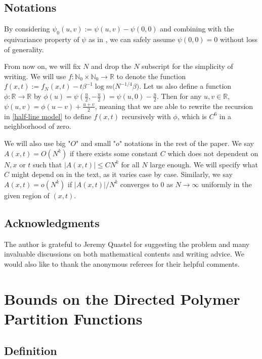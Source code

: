 \documentclass[10pt]{article}
\begin{document}
\subsection{Notations}

By considering $\psi_{0}(u, v):=\psi(u, v)-\psi(0,0)$ and combining with the equivariance property of $\psi$ as in \cite{adhikari2022invariance}, we can safely assume $\psi(0,0)=0$ without loss of generality.

From now on, we will fix $N$ and drop the $N$ subscript for the simplicity of writing. We will use $f: \mathbb{N}_0 \times \mathbb{N}_0 \to \mathbb{R}$ to denote the function $f(x, t):=f_{N}(x, t)-t\beta^{-1} \log m\big(N^{-1 / 4} \beta\big).$
Let us also define a function $\phi: \mathbb{R} \rightarrow \mathbb{R}$ by $\phi(u)=\psi\left(\frac{u}{2},-\frac{u}{2}\right)=\psi(u, 0)-\frac{u}{2}$. Then for any $u, v \in \mathbb{R}$, $\psi(u, v) =\phi(u-v)+\frac{u+v}{2}$, meaning that we are able to rewrite the recursion in \eqref{half-line model} to define $f(x,t)$ recursively with $\phi$, which is $C^{6}$ in a neighborhood of zero.

We will also use big "$O$" and small "$o$" notations in the rest of the paper. We say $A(x,t)=O(N^k)$ if there exists some constant $C$ which does not dependent on $N,x$ or $t$ such that $|A(x,t)| \leq CN^k$ for all $N$ large enough. We will specify what $C$ might depend on in the text, as it varies case by case. Similarly, we say $A(x,t)=o(N^k)$ if $|A(x,t)|/N^k$ converges to 0 as $N \to \infty$ uniformly in the given region of $(x,t)$.

\subsection{Acknowledgments}

The author is grateful to Jeremy Quastel for suggesting the problem and many invaluable discussions on both mathematical contents and writing advice. We would also like to thank the anonymous referees for their helpful comments.


\section{Bounds on the Directed Polymer Partition Functions}\label{directedpolymer}

\subsection{Definition}
\end{document}
